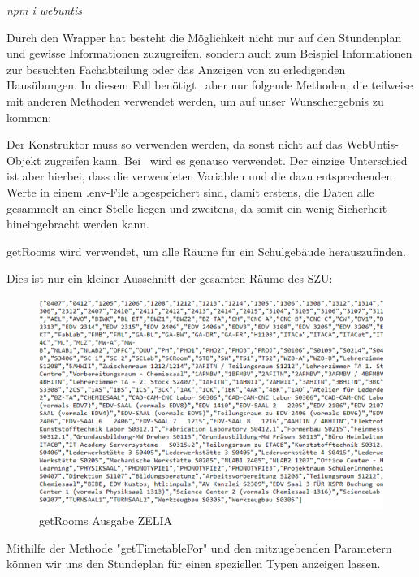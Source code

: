 \emph{npm i webuntis}

Durch den Wrapper hat besteht die Möglichkeit nicht nur auf den Stundenplan und gewisse Informationen zuzugreifen, sondern auch zum Beispiel Informationen zur besuchten Fachabteilung oder das Anzeigen von zu erledigenden Hausübungen. In diesem Fall benötigt \ZELIA\ aber nur folgende Methoden, die teilweise mit anderen Methoden verwendet werden, um auf unser Wunschergebnis zu kommen:



Der Konstruktor muss so verwenden werden, da sonst nicht auf das WebUntis-Objekt zugreifen kann. Bei \ZELIA\ wird es genauso verwendet. Der einzige Unterschied ist aber hierbei, dass die verwendeten Variablen und die dazu entsprechenden Werte in einem .env-File abgespeichert sind, damit erstens, die Daten alle gesammelt an einer Stelle liegen und zweitens, da somit ein wenig Sicherheit hineingebracht werden kann.


getRooms wird verwendet, um alle Räume für ein Schulgebäude herauszufinden.


Dies ist nur ein kleiner Ausschnitt der gesamten Räume des SZU:

\begin{figure}[H]
    \centering
    \includegraphics{media/WebUntis/getRoomsAusgabe.png}
    \caption{getRooms Ausgabe ZELIA}
\end{figure}

Mithilfe der Methode "getTimetableFor" und den mitzugebenden Parametern können wir uns den Stundeplan für einen speziellen Typen anzeigen lassen.


